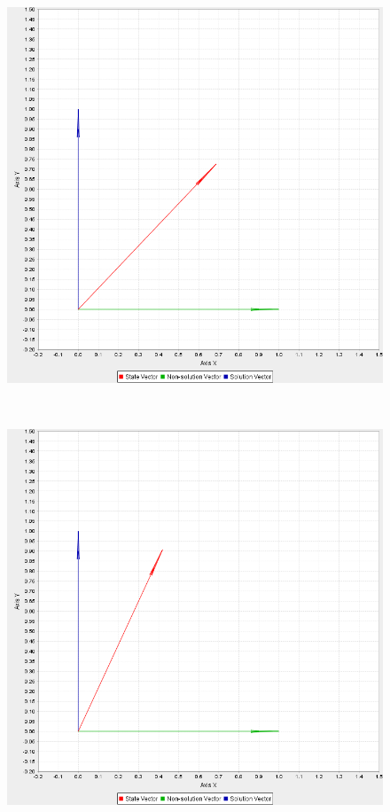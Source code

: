 \documentclass[bibliography=totocnumbered, 10pt]{article}
\theoremstyle{NoticeStyle}
\begin{document}
\begin{figure}[H]
\begin{minipage}{0.3\textwidth}
	\end{minipage}
	\begin{minipage}{0.3\textwidth}
		\includegraphics[width=\textwidth]{img/pic_6.png}
	\end{minipage}\\
	\begin{minipage}{0.3\textwidth}
		\includegraphics[width=\textwidth]{img/pic_9.png}

\end{minipage}
\end{figure}
\end{document}
